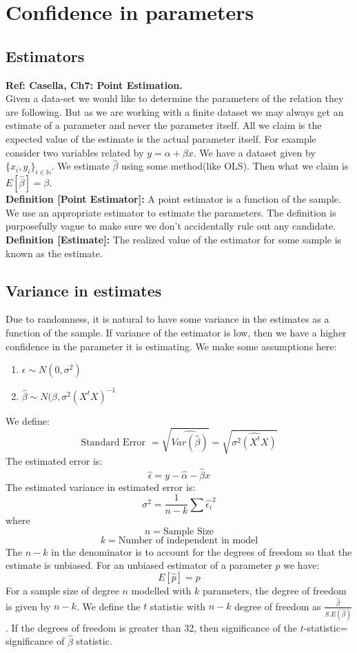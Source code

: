 \documentclass[notoc]{tufte-book}
\begin{document}
\section{Confidence in parameters}
\subsection{Estimators}
\textbf{Ref: Casella, Ch7: Point Estimation. \cite{Casella_Berger_20}}\\
Given a data-set we would like to determine the parameters of the relation they are following. But as we are working with a finite dataset we may always get an estimate of a parameter and never the parameter itself. All we claim is the expected value of the estimate is the actual parameter itself. For example consider two variables related by $y=\alpha+\beta x$. We have a dataset given by $\{x_i,y_i\}_{i\in\mathbb{N}}$. We estimate $\widehat\beta$ using some method(like OLS). Then what we claim is $E[\widehat\beta]=\beta$. \\
\textbf{Definition [Point Estimator]: }
A point estimator is a function of the sample.\\
We use an appropriate estimator to estimate the parameters. The definition is purposefully vague to make sure we don't accidentally rule out any candidate. \\
\textbf{Definition [Estimate]: }The realized value of the estimator for some sample is known as the estimate.


\subsection{Variance in estimates}
Due to randomness, it is natural to have some variance in the estimates as a function of the sample. If variance of the estimator is low, then we have a higher confidence in the parameter it is estimating. We make some assumptions here:
\begin{enumerate}
    \item $\epsilon\sim N(0,\sigma^2)$
    \item $\widehat\beta\sim N(\beta,\sigma^2(X^tX)^{-1}$
\end{enumerate}
We define:
$$\text{Standard Error }=\sqrt{\widehat{Var(\widehat\beta)}}=\sqrt{\widehat{\sigma^2(X^tX)}}$$
The estimated error is:
$$\hat{\epsilon}=y-\hat{\alpha}-\hat{\beta}x$$
The estimated variance in estimated error is:
$$\sigma^2=\frac{1}{n-k}\sum\hat{\epsilon_i}^2$$
where 
$$n=\text{Sample Size}$$
$$k=\text{Number of independent in model}$$
The $n-k$ in the denominator is to account for the degrees of freedom so that the estimate is unbiased. For an unbiased estimator of a parameter $p$ we have:
$$E[\hat{p}]=p$$
For a sample size of degree $n$ modelled with $k$ parameters, the degree of freedom is given by $n-k$. We define the $t$ statistic with $n-k$ degree of freedom as $\frac{\hat{\beta}}{S.E(\hat{\beta})}$. If the degrees of freedom is greater than 32, then significance of the $t$-statistic= significance of $\hat{\beta}$ statistic. 
\end{document}
